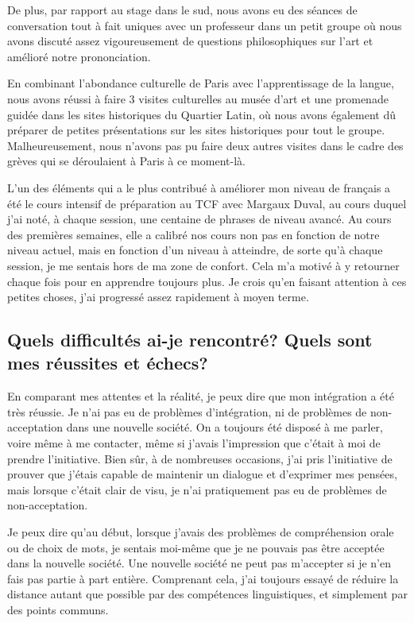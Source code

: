 \documentclass[a4paper,12pt]{article}
\begin{document}
De plus, par rapport au stage dans le sud, nous avons eu des séances de conversation tout à fait uniques avec un professeur dans un petit groupe où nous avons discuté assez vigoureusement de questions philosophiques sur l'art et amélioré notre prononciation. 

En combinant l'abondance culturelle de Paris avec l'apprentissage de la langue, nous avons réussi à faire 3 visites culturelles au musée d'art et une promenade guidée dans les sites historiques du Quartier Latin, où nous avons également dû préparer de petites présentations sur les sites historiques pour tout le groupe. Malheureusement, nous n'avons pas pu faire deux autres visites dans le cadre des grèves qui se déroulaient à Paris à ce moment-là. 

L'un des éléments qui a le plus contribué à améliorer mon niveau de français a été le cours intensif de préparation au TCF avec Margaux Duval, au cours duquel j'ai noté, à chaque session, une centaine de phrases de niveau avancé. Au cours des premières semaines, elle a calibré nos cours non pas en fonction de notre niveau actuel, mais en fonction d'un niveau à atteindre, de sorte qu'à chaque session, je me sentais hors de ma zone de confort. Cela m'a motivé à y retourner chaque fois pour en apprendre toujours plus. Je crois qu'en faisant attention à ces petites choses, j'ai progressé assez rapidement à moyen terme. 

\subsection{Quels difficultés ai-je rencontré? Quels sont mes réussites et échecs?}

En comparant mes attentes et la réalité, je peux dire que mon intégration a été très réussie. Je n'ai pas eu de problèmes d'intégration, ni de problèmes de non-acceptation dans une nouvelle société. On a toujours été disposé à me parler, voire même à me contacter, même si j'avais l'impression que c'était à moi de prendre l'initiative. Bien sûr, à de nombreuses occasions, j'ai pris l'initiative de prouver que j'étais capable de maintenir un dialogue et d'exprimer mes pensées, mais lorsque c'était clair de visu, je n'ai pratiquement pas eu de problèmes de non-acceptation.  

Je peux dire qu'au début, lorsque j'avais des problèmes de compréhension orale ou de choix de mots, je sentais moi-même que je ne pouvais pas être acceptée dans la nouvelle société. Une nouvelle société ne peut pas m'accepter si je n'en fais pas partie à part entière. Comprenant cela, j'ai toujours essayé de réduire la distance autant que possible par des compétences linguistiques, et simplement par des points communs. 
\end{document}
